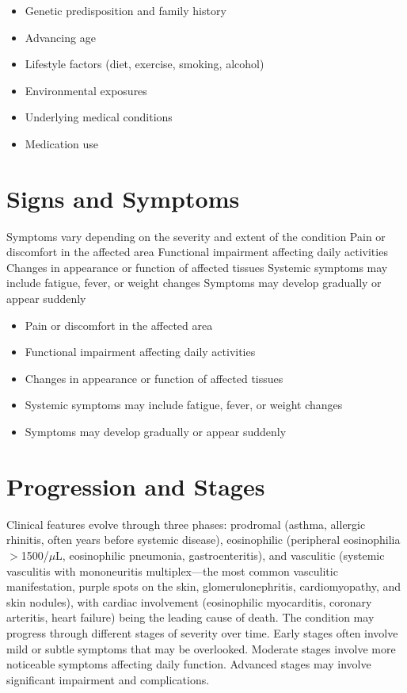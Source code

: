\begin{itemize}[noitemsep]
  \item Genetic predisposition and family history
  \item Advancing age
  \item Lifestyle factors (diet, exercise, smoking, alcohol)
  \item Environmental exposures
  \item Underlying medical conditions
  \item Medication use
\end{itemize}
\section{Signs and Symptoms}
Symptoms vary depending on the severity and extent of the condition Pain or discomfort in the affected area Functional impairment affecting daily activities Changes in appearance or function of affected tissues Systemic symptoms may include fatigue, fever, or weight changes Symptoms may develop gradually or appear suddenly

\begin{itemize}[noitemsep]
  \item Pain or discomfort in the affected area
  \item Functional impairment affecting daily activities
  \item Changes in appearance or function of affected tissues
  \item Systemic symptoms may include fatigue, fever, or weight changes
  \item Symptoms may develop gradually or appear suddenly
\end{itemize}
\section{Progression and Stages}
Clinical features evolve through three phases: prodromal (asthma, allergic rhinitis, often years before systemic disease), eosinophilic (peripheral eosinophilia $>$1500/$\mu$L, eosinophilic pneumonia, gastroenteritis), and vasculitic (systemic vasculitis with mononeuritis multiplex---the most common vasculitic manifestation, purple spots on the skin, glomerulonephritis, cardiomyopathy, and skin nodules), with cardiac involvement (eosinophilic myocarditis, coronary arteritis, heart failure) being the leading cause of death. The condition may progress through different stages of severity over time. Early stages often involve mild or subtle symptoms that may be overlooked. Moderate stages involve more noticeable symptoms affecting daily function. Advanced stages may involve significant impairment and complications.
